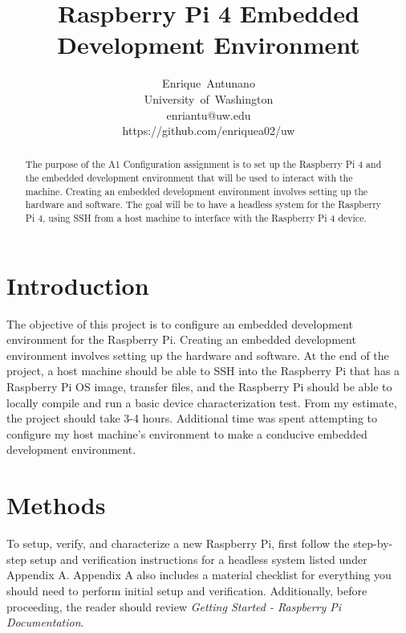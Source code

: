 \documentclass[journal]{IEEEtran}
\begin{document}
    \title{Raspberry Pi 4 Embedded Development Environment}

    \author{Enrique~Antunano\\University~of~Washington\\enriantu@uw.edu\\https://github.com/enriquea02/uw}


    \maketitle

    \begin{abstract}
        The purpose of the A1 Configuration assignment is to set up the Raspberry Pi 4 and the embedded development environment that will be used to interact with the machine. 
        Creating an embedded development environment involves setting up the hardware and software.
        The goal will be to have a headless system for the Raspberry Pi 4, using SSH from a host machine to interface with the Raspberry Pi 4 device.

    \end{abstract}
    \section{Introduction}
    The objective of this project is to configure an embedded development environment for the Raspberry Pi. 
    Creating an embedded development environment involves setting up the hardware and software. 
    At the end of the project, a host machine should be able to SSH into the Raspberry Pi that has a Raspberry Pi OS image, transfer files, and the Raspberry Pi should be able to locally compile and run a basic device characterization test.
    From my estimate, the project should take 3-4 hours. Additional time was spent attempting to configure my host machine's environment to make a conducive embedded development environment.

    \section{Methods}
    To setup, verify, and characterize a new Raspberry Pi, first follow the step-by-step setup and verification instructions for a headless system listed under Appendix A. 
    Appendix A also includes a material checklist for everything you should need to perform initial setup and verification.
    Additionally, before proceeding, the reader should review \emph{Getting Started - Raspberry Pi Documentation}.
\end{document}

